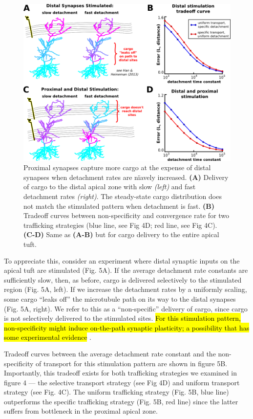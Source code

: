 \documentclass[10pt]{wlpeerj}
\begin{document}
\begin{figure}[!tb]
\begin{center}
\includegraphics[width=0.9\columnwidth]{05_heterosynaptic_ca1.png}
\caption{Proximal synapses capture more cargo at the expense of distal synapses when detachment rates are n\"iavely increased.
\textbf{(A)} Delivery of cargo to the distal apical zone with slow \textit{(left)} and fast detachment rates \textit{(right)}. The steady-state cargo distribution does not match the stimulated pattern when detachment is fast. \textbf{(B)} Tradeoff curves between non-specificity and convergence rate for two trafficking strategies (blue line, see Fig 4D; red line, see Fig 4C). \textbf{(C-D)} Same as \textbf{(A-B)} but for cargo delivery to the entire apical tuft.
}
\end{center}
\end{figure}

To appreciate this, consider an experiment where distal synaptic inputs on the apical tuft are stimulated (Fig. 5A).
If the average detachment rate constants are sufficiently slow, then, as before, cargo is delivered selectively to the stimulated region (Fig. 5A, left).
If we increase the detachment rates by a uniformly scaling, some cargo ``leaks off'' the microtubule path on its way to the distal synapses (Fig. 5A, right).
We refer to this as a ``non-specific'' delivery of cargo, since cargo is not selectively delivered to the stimulated sites.
\hl{For this stimulation pattern, non-specificity might induce on-the-path synaptic plasticity; a possibility that has some experimental evidence} \citep{Han_2013}.

Tradeoff curves between the average detachment rate constant and the non-specificity of transport for this stimulation pattern are shown in figure 5B.
Importantly, this tradeoff exists for both trafficking strategies we examined in figure 4 --- the selective transport strategy (see Fig 4D) and uniform transport strategy (see Fig. 4C).
The uniform trafficking strategy (Fig. 5B, blue line) outperforms the specific trafficking strategy (Fig. 5B, red line) since the latter suffers from bottleneck in the proximal apical zone.
\end{document}
